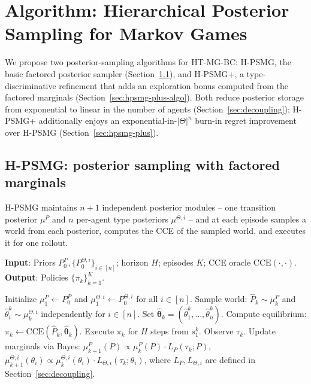 \documentclass{article}
\def\textsuperscript#1{#1}%
\begin{document}
\section{Algorithm: Hierarchical Posterior Sampling for Markov Games}
\label{sec:algorithm}

We propose two posterior-sampling algorithms for HT-MG-BC: H-PSMG, the basic factored posterior sampler (Section~\ref{sec:hpsmg-vanilla}), and H-PSMG\textsuperscript{+}, a type-discriminative refinement that adds an exploration bonus computed from the factored marginals (Section~\ref{sec:hpsmg-plus-algo}). Both reduce posterior storage from exponential to linear in the number of agents (Section~\ref{sec:decoupling}); H-PSMG\textsuperscript{+} additionally enjoys an exponential-in-$|\Theta|^n$ burn-in regret improvement over H-PSMG (Section~\ref{sec:hpsmg-plus}).

\subsection{H-PSMG: posterior sampling with factored marginals}
\label{sec:hpsmg-vanilla}

H-PSMG maintains $n+1$ independent posterior modules -- one transition posterior $\mu^P$ and $n$ per-agent type posteriors $\mu^{\Theta, i}$ -- and at each episode samples a world from each posterior, computes the CCE of the sampled world, and executes it for one rollout.

\begin{algorithm}[ht]
\caption{Hierarchical Posterior Sampling for Markov Games (H-PSMG)}
\label{alg:hpsmg}
\textbf{Input}: Priors $P_0^P, \{P_0^{\Theta,i}\}_{i \in [n]}$; horizon $H$; episodes $K$; CCE oracle $\mathrm{CCE}(\cdot, \cdot)$.\\
\textbf{Output}: Policies $\{\pi_k\}_{k=1}^K$.
\begin{algorithmic}[1]
\STATE Initialize $\mu_1^P \gets P_0^P$ and $\mu_1^{\Theta,i} \gets P_0^{\Theta,i}$ for all $i \in [n]$.
    \STATE Sample world: $\hat{P}_k \sim \mu_k^P$ and $\hat{\theta}_i^k \sim \mu_k^{\Theta,i}$ independently for $i \in [n]$. Set $\hat{\boldsymbol{\theta}}_k = (\hat{\theta}_1^k, \ldots, \hat{\theta}_n^k)$.
    \STATE Compute equilibrium: $\pi_k \gets \mathrm{CCE}(\hat{P}_k, \hat{\boldsymbol{\theta}}_k)$.
    \STATE Execute $\pi_k$ for $H$ steps from $s_1^k$. Observe $\tau_k$.
    \STATE Update marginals via Bayes:
    $\mu_{k+1}^P(P) \propto \mu_k^P(P) \cdot L_P(\tau_k; P)$,
    $\mu_{k+1}^{\Theta,i}(\theta_i) \propto \mu_k^{\Theta,i}(\theta_i) \cdot L_{\Theta,i}(\tau_k; \theta_i)$,
    where $L_P, L_{\Theta,i}$ are defined in Section~\ref{sec:decoupling}.
\ENDFOR
\end{algorithmic}
\end{algorithm}
\end{document}
